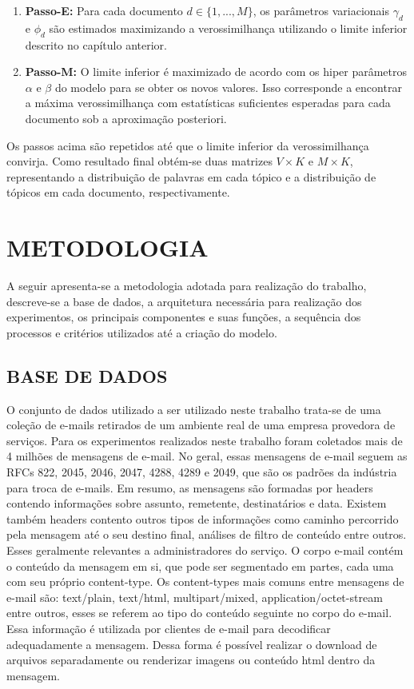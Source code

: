 \documentclass[12pt,a4paper]{article}
\begin{document}
\begin{enumerate}
\item \textbf{Passo-E:} Para cada documento $d \in \{1,. . . , M\}$, os parâmetros variacionais $\gamma_d$ e $\phi_d$ são estimados maximizando a verossimilhança utilizando o limite inferior descrito no capítulo anterior.
\item \textbf{Passo-M:} O limite inferior é maximizado  de acordo com os hiper parâmetros $\alpha$ e $\beta$ do modelo para se obter os novos valores. 
 Isso corresponde a encontrar a máxima verossimilhança com estatísticas suficientes esperadas para cada documento sob a aproximação posteriori.
\end{enumerate}

Os passos acima são repetidos até que o limite inferior da verossimilhança convirja. Como resultado final obtém-se duas matrizes $V \times K$ e $M \times K$,
 representando  a distribuição de palavras em cada tópico e a distribuição de tópicos em cada documento, respectivamente.



\section{METODOLOGIA} \label{sec:metodologia}

A seguir apresenta-se a metodologia adotada para realização do trabalho, descreve-se a base de dados, a arquitetura necessária 
 para realização dos experimentos, os principais componentes e suas funções, a sequência dos processos e critérios utilizados até a criação do modelo.

\subsection{BASE DE DADOS} \label{sec:base-de-dados}

O conjunto de dados utilizado a ser utilizado neste trabalho trata-se de uma coleção de e-mails retirados de um ambiente real de uma empresa provedora de serviços. 
 Para os experimentos realizados neste trabalho foram coletados mais de 4 milhões de mensagens de e-mail. No geral, essas mensagens de e-mail seguem as RFCs 822, 2045, 2046, 2047, 4288, 4289 e 2049,
 que são os padrões da indústria para troca de e-mails.	Em resumo, as mensagens são formadas por headers contendo informações sobre assunto, remetente, destinatários e data.
 Existem também headers contento outros tipos de informações como caminho percorrido pela mensagem até o seu destino final, análises de filtro de conteúdo entre outros. Esses geralmente relevantes a administradores do serviço. O corpo e-mail contém o conteúdo da mensagem em si, que pode ser segmentado em  partes, cada uma com seu próprio content-type. 
 Os content-types mais comuns entre mensagens de e-mail são: text/plain, text/html, multipart/mixed, application/octet-stream entre outros, esses se referem ao tipo do conteúdo seguinte no corpo do e-mail.
 Essa informação é utilizada por clientes de e-mail para decodificar adequadamente a mensagem. Dessa forma é possível realizar o download de arquivos separadamente ou renderizar imagens ou conteúdo html dentro da mensagem.
\end{document}
